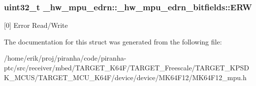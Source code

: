 \subsubsection[{\texorpdfstring{E\+RW}{ERW}}]{\setlength{\rightskip}{0pt plus 5cm}uint32\+\_\+t \+\_\+hw\+\_\+mpu\+\_\+edrn\+::\+\_\+hw\+\_\+mpu\+\_\+edrn\+\_\+bitfields\+::\+E\+RW}\hypertarget{struct__hw__mpu__edrn_1_1__hw__mpu__edrn__bitfields_a0545dc57014eba717ed10b6501a93c0e}{}\label{struct__hw__mpu__edrn_1_1__hw__mpu__edrn__bitfields_a0545dc57014eba717ed10b6501a93c0e}
\mbox{[}0\mbox{]} Error Read/\+Write 

The documentation for this struct was generated from the following file\+:\begin{DoxyCompactItemize}
\item 
/home/erik/proj/piranha/code/piranha-\/ptc/src/receiver/mbed/\+T\+A\+R\+G\+E\+T\+\_\+\+K64\+F/\+T\+A\+R\+G\+E\+T\+\_\+\+Freescale/\+T\+A\+R\+G\+E\+T\+\_\+\+K\+P\+S\+D\+K\+\_\+\+M\+C\+U\+S/\+T\+A\+R\+G\+E\+T\+\_\+\+M\+C\+U\+\_\+\+K64\+F/device/device/\+M\+K64\+F12/M\+K64\+F12\+\_\+mpu.\+h\end{DoxyCompactItemize}

